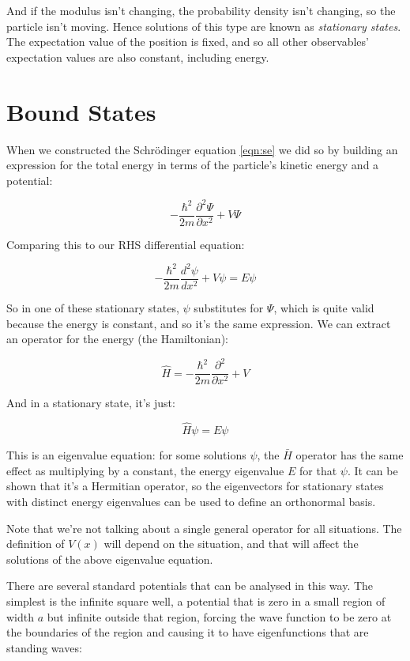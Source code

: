 And if the modulus isn't changing, the probability density isn't changing, so the particle isn't moving. Hence solutions of this type are known as \textit{stationary states}. The expectation value of the position is fixed, and so all other observables' expectation values are also constant, including energy.

\section{Bound States}

When we constructed the Schrödinger equation \eqref{eqn:se} we did so by building an expression for the total energy in terms of the particle's kinetic energy and a potential:

$$
- \frac{\hbar^2}{2m} \frac{\partial^2 \Psi}{\partial x^2} + V{\Psi}
$$  

Comparing this to our RHS differential equation:

$$
- \frac{\hbar^2}{2m}
\frac{d^2 \psi}{d x^2}
+ V\psi
=
E\psi
$$

So in one of these stationary states, $\psi$ substitutes for $\Psi$, which is quite valid because the energy is constant, and so it's the same expression. We can extract an operator for the energy (the Hamiltonian):

$$
\hat{H} = 
- \frac{\hbar^2}{2m} \frac{\partial^2}{\partial x^2} + V
$$

And in a stationary state, it's just:

$$
\hat{H}\psi
=
E\psi
$$

This is an eigenvalue equation: for some solutions $\psi$, the $\bar{H}$ operator has the same effect as multiplying by a constant, the energy eigenvalue $E$ for that $\psi$. It can be shown that it's a Hermitian operator, so the eigenvectors for stationary states with distinct energy eigenvalues can be used to define an orthonormal basis.

Note that we're not talking about a single general operator for all situations. The definition of $V(x)$ will depend on the situation, and that will affect the solutions of the above eigenvalue equation.

There are several standard potentials that can be analysed in this way. The simplest is the infinite square well, a potential that is zero in a small region of width $a$ but infinite outside that region, forcing the wave function to be zero at the boundaries of the region and causing it to have eigenfunctions that are standing waves:

